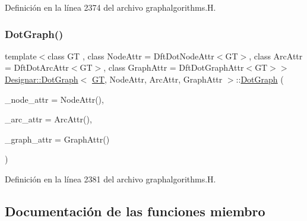 Definición en la línea 2374 del archivo graphalgorithms.\+H.

\mbox{\label{class_designar_1_1_dot_graph_a73a8e33201f40c6a3085eda7a573af6f}} 
\subsubsection{\texorpdfstring{Dot\+Graph()}{DotGraph()}\hspace{0.1cm}{\footnotesize\ttfamily [2/2]}}
{\footnotesize\ttfamily template$<$class GT , class Node\+Attr  = Dft\+Dot\+Node\+Attr$<$\+G\+T$>$, class Arc\+Attr  = Dft\+Dot\+Arc\+Attr$<$\+G\+T$>$, class Graph\+Attr  = Dft\+Dot\+Graph\+Attr$<$\+G\+T$>$$>$ \\
\hyperlink{class_designar_1_1_dot_graph}{Designar\+::\+Dot\+Graph}$<$ \hyperlink{demo-buildgraph_8_c_a3001c40d2c31ca87ed96cd7d1334a55e}{GT}, Node\+Attr, Arc\+Attr, Graph\+Attr $>$\+::\hyperlink{class_designar_1_1_dot_graph}{Dot\+Graph} (\begin{DoxyParamCaption}\item[{Node\+Attr \&\&}]{\+\_\+node\+\_\+attr = {\ttfamily NodeAttr()},  }\item[{Arc\+Attr \&\&}]{\+\_\+arc\+\_\+attr = {\ttfamily ArcAttr()},  }\item[{Graph\+Attr \&\&}]{\+\_\+graph\+\_\+attr = {\ttfamily GraphAttr()} }\end{DoxyParamCaption})\hspace{0.3cm}{\ttfamily [inline]}}



Definición en la línea 2381 del archivo graphalgorithms.\+H.



\subsection{Documentación de las funciones miembro}
\mbox{\label{class_designar_1_1_dot_graph_afa9f692e6ec45dba1cd8e9ebf830f212}} 
